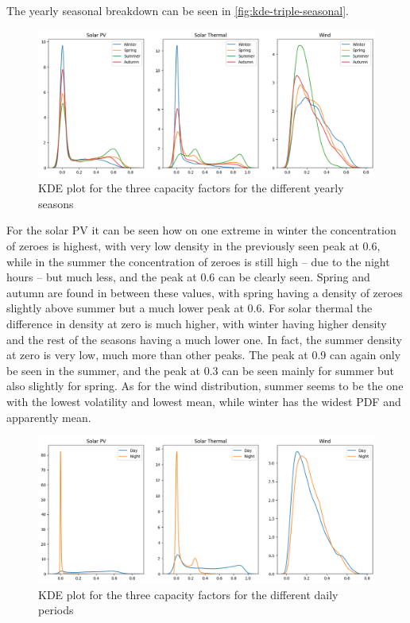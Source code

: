 The yearly seasonal breakdown can be seen in \autoref{fig:kde-triple-seasonal}. 

\begin{figure}[ht]
    \centering
    \captionsetup{justification=centering}
    \includegraphics[width=\linewidth]{assets/kde-triple-seasonal.png}
    \caption{KDE plot for the three capacity factors for the different yearly seasons}
    \label{fig:kde-triple-seasonal}
\end{figure}

For the solar PV it can be seen how on one extreme in winter the concentration of zeroes is highest, with very low density in the previously seen peak at 0.6, while in the summer the concentration of zeroes is still high -- due to the night hours -- but much less, and the peak at 0.6 can be clearly seen. Spring and autumn are found in between these values, with spring having a density of zeroes slightly above summer but a much lower peak at 0.6. For solar thermal the difference in density at zero is much higher, with winter having higher density and the rest of the seasons having a much lower one. In fact, the summer density at zero is very low, much more than other peaks. The peak at 0.9 can again only be seen in the summer, and the peak at 0.3 can be seen mainly for summer but also slightly for spring. As for the wind distribution, summer seems to be the one with the lowest volatility and lowest mean, while winter has the widest PDF and apparently mean.  

\begin{figure}[ht]
    \centering
    \captionsetup{justification=centering}
    \includegraphics[width=\linewidth]{assets/kde-triple-daily.png}
    \caption{KDE plot for the three capacity factors for the different daily periods}
    \label{fig:kde-triple-daily}
\end{figure}


